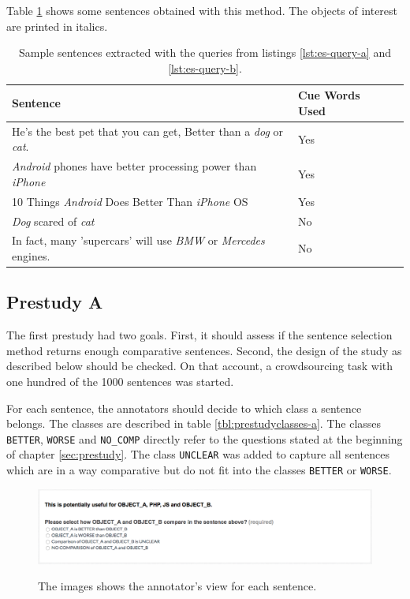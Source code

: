 Table \ref{tbl:example_sentences} shows some sentences obtained with this method. The objects of interest are printed in italics.

\begin{table}[h]
\centering
\caption{Sample sentences extracted with the queries from listings \ref{lst:es-query-a} and \ref{lst:es-query-b}.}
\label{tbl:example_sentences}
\begin{tabular}{@{}llr@{}}
\toprule
 Sentence   &  Cue Words Used                      \\ \midrule
 He's the best pet that you can get, Better than a \emph{dog} or \emph{cat}. & Yes \\
\emph{Android} phones have better processing power than \emph{iPhone} & Yes \\
 10 Things \emph{Android} Does Better Than \emph{iPhone} OS & Yes \\
 \emph{Dog} scared of \emph{cat} & No \\
 In fact, many 'supercars' will use \emph{BMW} or \emph{Mercedes} engines. & No \\

\bottomrule  
                               
\end{tabular}
\end{table}



\subsection{Prestudy A}
The first prestudy had two goals. First, it should assess if the sentence selection method returns enough comparative sentences. Second, the design of the study as described below should be checked. On that account, a crowdsourcing task with one hundred of the 1000 sentences was started.



For each sentence, the annotators should decide to which class a sentence belongs. The classes are described in table \ref{tbl:prestudyclasses-a}. The classes \texttt{BETTER}, \texttt{WORSE} and \texttt{NO\_COMP} directly refer to the questions stated at the beginning of chapter \ref{sec:prestudy}. The class \texttt{UNCLEAR} was added to capture all sentences which are in a way comparative but do not fit into the classes \texttt{BETTER} or \texttt{WORSE}.

\begin{figure}[h]
\centering
\includegraphics[width=1\textwidth]{images/prestudy/1_question}
\label{img:1_question}
\caption{The images shows the annotator's view for each sentence.}
\end{figure}

